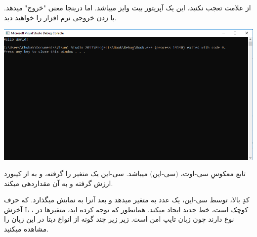 \documentclass[14pt,a4paper]{memoir}
\begin{document}
	 از علامت \lr{\mono\lstinline|>>|} تعجب نکنید، این یک آپریتور بیت وایز میباشد. اما درینجا معنی "خروج" میدهد. با زدن  خروجی نرم افزار را خواهید دید.
	 
	 \begin{center}
	 	\includegraphics[scale=0.3]{HelloWorld}
	 \end{center}
	 
	 
	 تابع معکوسِ سی-اوت،  $ \text{(سی-این)} $ میباشد. سی-این یک متغیر را گرفته، و به از کیبورد ارزش گرفته و به آن مقداردهی میکند.
	 
	 	 	 	 	 \begin{latin}
 	
	 	
	 \end{latin}
	 
	 
	 کدِ بالا، توسط سی-این، یک عدد به متغیر میدهد و بعد آنرا به نمایش میگذارد.  که حرف آخرش L کوچک است، خط جدید ایجاد میکند.
	 همانطور که توجه کرده اید، متغیرها در ، نوع دارند چون  زبان تایپ امن است. زیر زیر چند گونه از انواع دیتا در این زبان را مشاهده میکنید.
	 	 	 	 \begin{latin}
	
\end{latin}
	 
\end{document}
